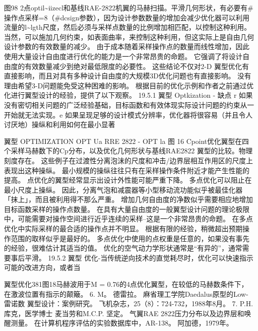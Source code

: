 \documentclass[UTF8,11pt,a4paper,openany,fontset=fandol]{ctexbook}
\begin{document}
图98 2点optil\textasciitilde{}iizecl和基线RAE-2822机翼的马赫扫描。平滑几何形状，有必要有\#操作点采样=8（\#dcsign参数），因为设计参数数量的增加会减少优化器可以利用流量的l\textasciitilde{}lgth尺度，然后必须与采样点数量的比例增加相匹配，以控制这种利用。 当然，可以施加几何约束，如表面曲率，来控制这种利用，但这实际上是自由几何设计参数的有效数量的减少。 由于成本随着采样操作点的数量而线性增加，因此使用大量设计自由度进行优化的能力是一个非常昂贵的命题。 它强调了将设计自由度的有效数量减少到绝对最低限度的必要性。 这些结论不仅对2-D 翼型优化有直接影响，而且对具有多种设计自由度的大规模3D优化问题也有直接影响。 没有理由希望3-D问题能免受这种困难的影响。 根据目前的优化示例和作者之前通过优化进行翼型设计的经验，提供了以下观察。 19.5.1 翼型 Optkization - 缺点 r 如果没有密切相关问题的广泛经验基础，目标函数和有效体现实际设计问题的约束从一开始就无法实现。e 如果呈现足够的设计模式分辨率，优化器将很容易（并且令人讨厌地）操纵和利用如何在最小显著

翼型 OPTIMIZATION OPT Ua RRE 2822 - OPT la 图 16 Cpoint优化翼型在四个采样马赫数下的Cp分布，以及优化几何形状与基线RAE2822 翼型的比较。物理刻度存在。 这些例子在过渡性分离泡沫的尺度和冲击/边界层相互作用区的尺度上表现出这种操纵。 最小规模的操纵往往只有在采样操作条件附近才能产生性能的提高。 点优化的翼型经常显示出设计外性能可能严重下降。 多点优化可以阻止在最小尺度上操纵。 因此，分离气泡和减震器等小型移动流功能似乎被最佳化器「抹上」，而且被利用得不那么严重。 增加几何自由度的净数似乎需要相应地增加目标函数采样的操作点数量。 在具有大量自由度的一般翼型设计问题的理论极限中，可能需要对操作空间进行近乎连续的采样--这是一个非常昂贵的命题。 在多点优化中实际采样的最合适的操作点并不明显。 根据有限的经验，稍微超出预期操作范围的取样似乎是最好的。 多点优化中使用的点权重是任意的，如果没有事先的经验，很难估计其适当的值。 优化的空气动力学形状通常是“有异的”，通常需要事后平滑。 19.5.2 翼型 优化-当传统逆向技术的直觉耗尽时，优化可以快速指示可能的改进方向，或者当

翼型优化381图18马赫波用于M = 0.76的4点优化翼型，在较低的马赫数条件下，在激波位置有指示的颠簸。 6. M。 德雷拉。 麻省理工学院Daedalus原型的Low-雷诺数 翼型设计：案例研究。 飞机杂志，25（8）：724-732，1988年8月。 7. P.H. 库克，医学博士 麦当劳和M.C.P. 坚定。 气翼RAE 2822压力分布以及边界层和唤醒测量。 在计算机程序评估的实验数据库中，AR-138。 阿加德，1979年。

\clearpage
\end{document}
